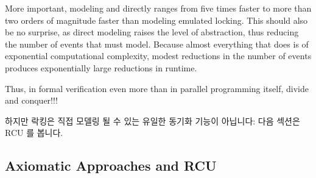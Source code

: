 {	More important, modeling  and 
	directly ranges from five times faster to more than two orders
	of magnitude faster than modeling emulated locking.
	This should also be no surprise, as direct modeling raises
	the level of abstraction, thus reducing the number of events
	that  must model.
	Because almost everything that  does is of exponential
	computational complexity, modest reductions in the number of
	events produces exponentially large reductions in runtime.

	Thus, in formal verification even more than in parallel
	programming itself, divide and conquer!!!

	\fi

}\QuickQuizEnd

하지만 락킹은 직접 모델링 될 수 있는 유일한 동기화 기능이 아닙니다:
다음 섹션은 RCU 를 봅니다.

\iffalse

But locking is not the only synchronization primitive that can be
modeled directly:
The next section looks at RCU\@.

\fi

\subsection{Axiomatic Approaches and RCU}
\label{sec:formal:Axiomatic Approaches and RCU}

